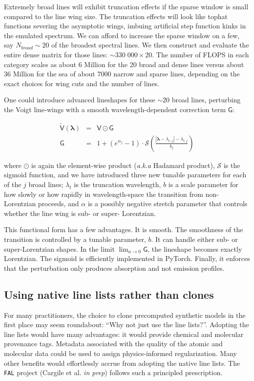 \documentclass[twocolumn]{aastex631}
\begin{document}
Extremely broad lines will exhibit truncation effects if the sparse window is small compared to the line wing size. The truncation effects will look like tophat functions severing the asymptotic wings, imbuing artificial step function kinks in the emulated spectrum. We can afford to increase the sparse window on a few, say $N_{broad}\sim20$ of the broadest spectral lines. We then construct and evaluate the entire dense matrix for those lines: $\sim 330\;000 \times 20$. The number of FLOPS in each category scales as about 6 Million for the 20 broad and dense lines versus about 36 Million for the sea of about 7000 narrow and sparse lines, depending on the exact choices for wing cuts and the number of lines.

One could introduce advanced lineshapes for these $\sim20$ broad lines, perturbing the Voigt line-wings with a smooth wavelength-dependent correction term $\mathsf{G}$:

\begin{eqnarray}
    \mathsf{\tilde{V}(\bm{\lambda})} &=& \mathsf{V} \odot \mathsf{G}\\
    \mathsf{G} &=& 1 + (e^{\alpha_j} - 1) \cdot \mathcal{S}\left(\frac{|\bm{\lambda}-\lambda_{c,j}| - \lambda_{t, j}}{b_j}\right)
\end{eqnarray}

where $\odot$ is again the element-wise product (\emph{a.k.a} Hadamard product), $\mathcal{S}$ is the sigmoid function, and we have introduced three new tunable parameters for each of the $j$ broad lines; $\lambda_t$ is the truncation wavelength, $b$ is a scale parameter for how slowly or how rapidly in wavelength-space the transition from non-Lorentzian proceeds, and $\alpha$ is a possibly negative stretch parameter that controls whether the line wing is sub- or super- Lorentzian.

This functional form has a few advantages. It is smooth. The smoothness of the transition is controlled by a tunable parameter, $b$. It can handle either sub- or super-Lorentzian shapes.  In the limit $\lim_{a\to0} \mathsf{G}$, the lineshape becomes exactly Lorentzian. The sigmoid is efficiently implemented in PyTorch.
Finally, it enforces that the perturbation only produces absorption and not emission profiles.


\subsection{Using native line lists rather than clones}
For many practitioners, the choice to clone precomputed synthetic models in the first place may seem roundabout: ``Why not just use the line lists?''.  Adopting the line lists would have many advantages: it would provide chemical and molecular provenance tags.  Metadata associated with the quality of the atomic and molecular data could be used to assign physics-informed regularization.  Many other benefits would effortlessly accrue from adopting the native line lists.  The \texttt{FAL} project (Cargile et al. \emph{in prep}) follows such a principled prescription.
\end{document}
